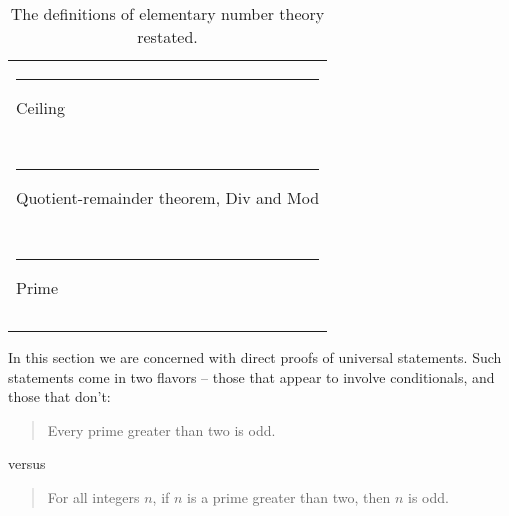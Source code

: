 \begin{table}[hbt]
\begin{center}
\begin{tabular}{l}
\rule{12pt}{0pt} Ceiling\\
\framebox{\begin{minipage}{.8\textwidth}%
\rule[-6pt]{0pt}{20pt} $\forall x \in \Reals$, \\
\centerline{\rule[-6pt]{0pt}{20pt}$y = \lceil x \rceil$  \rule{6pt}{0pt} $\iff$ \rule{6pt}{0pt} 
$ y \in \Integers \, \; \land \, \; y-1 < x \leq y$} \end{minipage} }\\
\rule{12pt}{0pt} Quotient-remainder theorem, Div and Mod\\
\framebox{\begin{minipage}{.8\textwidth}%
\rule[-6pt]{0pt}{20pt}$\forall n, d>0 \in \Integers$,\\
\centerline{\rule[-6pt]{0pt}{20pt}$\exists \mbox{!} q,r \in \Integers, \; n = qd + r \, \; \land \, \; 0 \leq r < d $} 
\rule[-6pt]{0pt}{20pt}\centerline{$n \; \mbox{div} \; d = q$} \newline
\rule[-6pt]{0pt}{20pt}\centerline{$n \; \mbox{mod} \; d = r$} 
\end{minipage} }\\
\rule{12pt}{0pt} Prime\\
\framebox{\begin{minipage}{.8\textwidth}%
\rule[-6pt]{0pt}{20pt}$\forall \, p \, \in \Integers$\\
\rule[-6pt]{0pt}{20pt}\centerline{$p$ is prime \rule{6pt}{0pt}%
$\iff$ \rule{60pt}{0pt} }
\rule[-6pt]{0pt}{12pt}\centerline{\rule{30pt}{0pt} $(p>1) \quad \land \quad (\forall x,y \in \Integers^+, \; p=xy \; \implies \; x=1 \, \lor \,  y=1)$} 
\end{minipage} }\\
\end{tabular}
\end{center}
\caption{The definitions of elementary number theory restated.}
\label{tab:defs}
\end{table}
\clearpage 

In this section we are concerned with 
direct proofs of universal statements.  
Such statements come in two flavors -- those that appear to involve 
conditionals, and those that don't:

\begin{quote} Every prime greater than two is odd.
\end{quote}

versus

\begin{quote} For all integers $n$, if $n$ is a prime greater than two, then $n$ is odd.
\end{quote}

